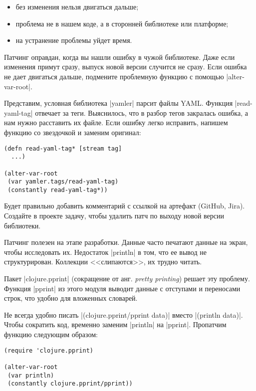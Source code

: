 \begin{itemize}

\item
  без изменения нельзя двигаться дальше;

\item
  проблема не в нашем коде, а в сторонней библиотеке или платформе;

\item
  на устранение проблемы уйдет время.

\end{itemize}

Патчинг оправдан, когда вы нашли ошибку в чужой библиотеке. Даже если изменения
примут сразу, выпуск новой версии случится не сразу. Если ошибка не дает
двигаться дальше, подмените проблемную функцию с помощью
\spverb|alter-var-root|.

Представим, условная библиотека \spverb|yamler| парсит файлы YAML. Функция
\spverb|read-yaml-tag| отвечает за теги. Выяснилось, что в разбор тегов
закралась ошибка, а нам нужно расставить их файле. Если ошибку легко исправить,
напишем функцию со звездочкой и заменим оригинал:

\begin{verbatim}
(defn read-yaml-tag* [stream tag]
  ...)

(alter-var-root
 (var yamler.tags/read-yaml-tag)
 (constantly read-yaml-tag*))
\end{verbatim}

Будет правильно добавить комментарий с ссылкой на артефакт (GitHub,
Jira). Создайте в проекте задачу, чтобы удалить патч по выходу новой версии
библиотеки.

Патчинг полезен на этапе разработки. Данные часто печатают данные на экран,
чтобы исследовать их. Недостаток \spverb|println| в том, что ее вывод не
структурирован. Коллекции <<слипаются>>, их трудно читать.

Пакет \spverb|clojure.pprint| (сокращение от анг. \emph{pretty printing}) решает
эту проблему. Функция \spverb|pprint| из этого модуля выводит данные с отступами
и переносами строк, что удобно для вложенных словарей.

Не всегда удобно писать \spverb|(clojure.pprint/pprint data)| вместо
\spverb|(println data)|. Чтобы сократить код, временно заменим \spverb|println|
на \spverb|pprint|. Пропатчим функцию следующим образом:

\begin{verbatim}
(require 'clojure.pprint)

(alter-var-root
 (var println)
 (constantly clojure.pprint/pprint))
\end{verbatim}

